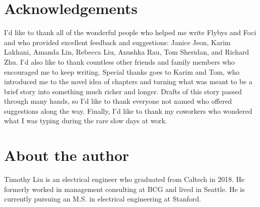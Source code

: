 \documentclass[openany, 12pt]{book} %
\begin{document}
\chapter*{Acknowledgements}
I'd like to thank all of the wonderful people who helped me write Flybys and Foci and who provided excellent feedback and suggestions: Janice Jeon, Karim Lakhani, Amanda Lin, Rebecca Liu, Anushka Rau, Tom Sheridan, and Richard Zhu. I'd also like to thank countless other friends and family members who encouraged me to keep writing. Special thanks goes to Karim and Tom, who introduced me to the novel idea of chapters and turning what was meant to be a brief story into something much richer and longer. Drafts of this story passed through many hands, so I'd like to thank everyone not named who offered suggestions along the way. Finally, I'd like to thank my coworkers who wondered what I was typing during the rare slow days at work.

\chapter*{About the author}
Timothy Liu is an electrical engineer who graduated from Caltech in 2018. He formerly worked in management consulting at BCG and lived in Seattle. He is currently pursuing an M.S. in electrical engineering at Stanford.
\end{document}
